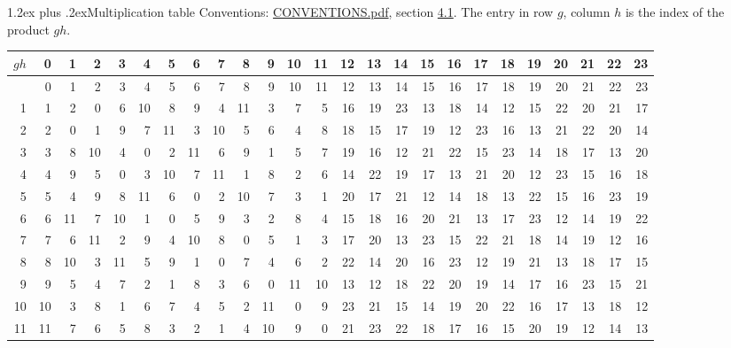 \documentclass[10pt,a4paper]{article}
\makeatletter
\renewcommand\section{\@startsection{section}{1}{\z@}{-3ex plus -1ex minus -.2ex}%
  {1.2ex plus .2ex}{\normalfont\large\sffamily\bfseries\color{parttitle}}}
\numberwithin{equation}{section}
\makeatother
\begin{document}
\section{Multiplication table}\label{s:multiplication}
Conventions: \href{../../CONVENTIONS.pdf}{CONVENTIONS.pdf}, section \href{../../CONVENTIONS.pdf\#conv.4.1}{4.1}.
The entry in row $g$, column $h$ is the index of the product $gh$.
{\normalsize\setlength{\tabcolsep}{0.1em}\setlength{\LTleft}{-8pt plus 1fill}\setlength{\LTright}{-8pt plus 1fill}\begin{longtable}{@{}r|rrrrrrrrrrrrrrrrrrrrrrrr@{}}\toprule
$gh$ & 0 & 1 & 2 & 3 & 4 & 5 & 6 & 7 & 8 & 9 & 10 & 11 & 12 & 13 & 14 & 15 & 16 & 17 & 18 & 19 & 20 & 21 & 22 & 23\\\midrule\endhead
\bottomrule\endfoot\endlastfoot
0 & 0 & 1 & 2 & 3 & 4 & 5 & 6 & 7 & 8 & 9 & 10 & 11 & 12 & 13 & 14 & 15 & 16 & 17 & 18 & 19 & 20 & 21 & 22 & 23\\*
1 & 1 & 2 & 0 & 6 & 10 & 8 & 9 & 4 & 11 & 3 & 7 & 5 & 16 & 19 & 23 & 13 & 18 & 14 & 12 & 15 & 22 & 20 & 21 & 17\\
2 & 2 & 0 & 1 & 9 & 7 & 11 & 3 & 10 & 5 & 6 & 4 & 8 & 18 & 15 & 17 & 19 & 12 & 23 & 16 & 13 & 21 & 22 & 20 & 14\\
3 & 3 & 8 & 10 & 4 & 0 & 2 & 11 & 6 & 9 & 1 & 5 & 7 & 19 & 16 & 12 & 21 & 22 & 15 & 23 & 14 & 18 & 17 & 13 & 20\\
4 & 4 & 9 & 5 & 0 & 3 & 10 & 7 & 11 & 1 & 8 & 2 & 6 & 14 & 22 & 19 & 17 & 13 & 21 & 20 & 12 & 23 & 15 & 16 & 18\\
5 & 5 & 4 & 9 & 8 & 11 & 6 & 0 & 2 & 10 & 7 & 3 & 1 & 20 & 17 & 21 & 12 & 14 & 18 & 13 & 22 & 15 & 16 & 23 & 19\\
6 & 6 & 11 & 7 & 10 & 1 & 0 & 5 & 9 & 3 & 2 & 8 & 4 & 15 & 18 & 16 & 20 & 21 & 13 & 17 & 23 & 12 & 14 & 19 & 22\\
7 & 7 & 6 & 11 & 2 & 9 & 4 & 10 & 8 & 0 & 5 & 1 & 3 & 17 & 20 & 13 & 23 & 15 & 22 & 21 & 18 & 14 & 19 & 12 & 16\\
8 & 8 & 10 & 3 & 11 & 5 & 9 & 1 & 0 & 7 & 4 & 6 & 2 & 22 & 14 & 20 & 16 & 23 & 12 & 19 & 21 & 13 & 18 & 17 & 15\\
9 & 9 & 5 & 4 & 7 & 2 & 1 & 8 & 3 & 6 & 0 & 11 & 10 & 13 & 12 & 18 & 22 & 20 & 19 & 14 & 17 & 16 & 23 & 15 & 21\\
10 & 10 & 3 & 8 & 1 & 6 & 7 & 4 & 5 & 2 & 11 & 0 & 9 & 23 & 21 & 15 & 14 & 19 & 20 & 22 & 16 & 17 & 13 & 18 & 12\\
11 & 11 & 7 & 6 & 5 & 8 & 3 & 2 & 1 & 4 & 10 & 9 & 0 & 21 & 23 & 22 & 18 & 17 & 16 & 15 & 20 & 19 & 12 & 14 & 13\\

\end{longtable}}
\end{document}
